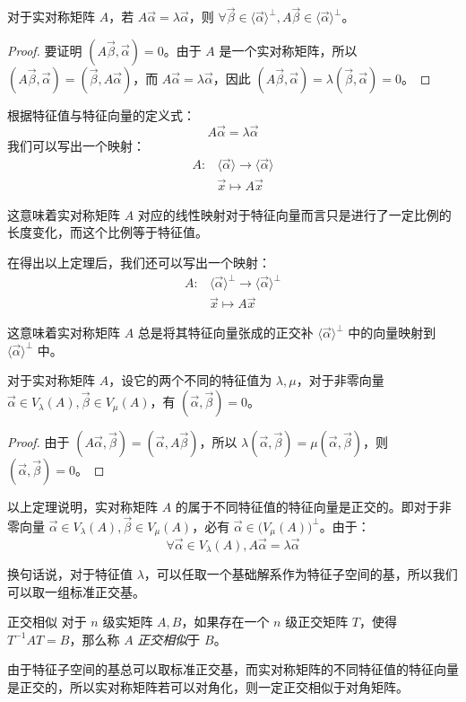 \begin{theorem}
	对于实对称矩阵 $A$，若 $A \vec \alpha = \lambda \vec \alpha$，则 $\forall \vec \beta \in \langle \vec \alpha \rangle^\perp, A \vec \beta \in \langle \vec \alpha \rangle^\perp$。
\end{theorem}

\begin{proof}
	要证明 $(A \vec \beta, \vec \alpha) = 0$。由于 $A$ 是一个实对称矩阵，所以 $(A \vec \beta, \vec \alpha) = (\vec \beta, A \vec \alpha)$，而 $A \vec \alpha = \lambda \vec \alpha$，因此 $(A \vec \beta, \vec \alpha) = \lambda(\vec \beta, \vec \alpha) = 0$。
\end{proof}

根据特征值与特征向量的定义式：
$$
A \vec \alpha = \lambda \vec \alpha
$$
我们可以写出一个映射：
$$
\begin{aligned}
	A \colon & \langle \vec \alpha \rangle \rightarrow \langle \vec \alpha \rangle
	\\&
	\vec x \mapsto A \vec x
\end{aligned}
$$

这意味着实对称矩阵 $A$ 对应的线性映射对于特征向量而言只是进行了一定比例的长度变化，而这个比例等于特征值。

在得出以上定理后，我们还可以写出一个映射：
$$
\begin{aligned}
	A \colon & \langle \vec \alpha \rangle^\perp \rightarrow \langle \vec \alpha \rangle^\perp
	\\&
	\vec x \mapsto A \vec x
\end{aligned}
$$

这意味着实对称矩阵 $A$ 总是将其特征向量张成的正交补 $\langle \vec \alpha \rangle^\perp$ 中的向量映射到 $\langle \vec \alpha \rangle^\perp$ 中。

\begin{theorem}
	对于实对称矩阵 $A$，设它的两个不同的特征值为 $\lambda, \mu$，对于非零向量 $\vec \alpha \in V_\lambda(A), \vec \beta \in V_\mu(A)$，有 $(\vec \alpha, \vec \beta) = 0$。
\end{theorem}

\begin{proof}
	由于 $(A \vec \alpha, \vec \beta) = (\vec \alpha, A \vec \beta)$，所以 $\lambda(\vec \alpha, \vec \beta) = \mu (\vec \alpha, \vec \beta)$，则 $(\vec \alpha, \vec \beta) = 0$。
\end{proof}

以上定理说明，实对称矩阵 $A$ 的属于不同特征值的特征向量是正交的。即对于非零向量 $\vec \alpha \in V_\lambda(A), \vec \beta \in V_\mu(A)$，必有 $\vec \alpha \in \bigl( V_\mu(A) \bigr)^\perp$。由于：
$$
\forall \vec \alpha \in V_\lambda(A), A \vec \alpha = \lambda \vec \alpha
$$

换句话说，对于特征值 $\lambda$，可以任取一个基础解系作为特征子空间的基，所以我们可以取一组标准正交基。

\begin{definition}{正交相似}
	对于 $n$ 级实矩阵 $A, B$，如果存在一个 $n$ 级正交矩阵 $T$，使得 $T^{-1} A T = B$，那么称 $A$ \emph{正交相似}于 $B$。
\end{definition}

由于特征子空间的基总可以取标准正交基，而实对称矩阵的不同特征值的特征向量是正交的，所以实对称矩阵若可以对角化，则一定正交相似于对角矩阵。

